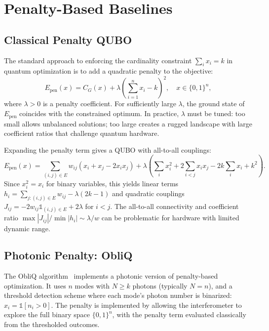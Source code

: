\section{Penalty-Based Baselines}
\label{sec:penalty}

\subsection{Classical Penalty QUBO}

The standard approach to enforcing the cardinality constraint $\sum_i x_i = k$ in quantum optimization is to add a quadratic penalty to the objective:
\begin{equation}
\label{eq:penalty_qubo}
E_{\mathrm{pen}}(x) = C_G(x) + \lambda \left( \sum_{i=1}^n x_i - k \right)^2, \quad x \in \{0,1\}^n,
\end{equation}
where $\lambda > 0$ is a penalty coefficient. For sufficiently large $\lambda$, the ground state of $E_{\mathrm{pen}}$ coincides with the constrained optimum. In practice, $\lambda$ must be tuned: too small allows unbalanced solutions; too large creates a rugged landscape with large coefficient ratios that challenge quantum hardware.

Expanding the penalty term gives a QUBO with all-to-all couplings:
\begin{equation}
E_{\mathrm{pen}}(x) = \sum_{(i,j)\in E} w_{ij} (x_i + x_j - 2x_i x_j) + \lambda \left( \sum_i x_i^2 + 2\sum_{i<j} x_i x_j - 2k\sum_i x_i + k^2 \right).
\end{equation}
Since $x_i^2 = x_i$ for binary variables, this yields linear terms $h_i = \sum_{j:(i,j)\in E} w_{ij} - \lambda(2k-1)$ and quadratic couplings $J_{ij} = -2w_{ij}\mathbb{1}_{(i,j)\in E} + 2\lambda$ for $i<j$. The all-to-all connectivity and coefficient ratio $\max|J_{ij}|/\min|h_i| \sim \lambda/w$ can be problematic for hardware with limited dynamic range.

\subsection{Photonic Penalty: ObliQ}

The ObliQ algorithm~\cite{wang2023bosonic} implements a photonic version of penalty-based optimization. It uses $n$ modes with $N \ge k$ photons (typically $N=n$), and a threshold detection scheme where each mode's photon number is binarized: $x_i = \mathbb{1}[n_i > 0]$. The penalty is implemented by allowing the interferometer to explore the full binary space $\{0,1\}^n$, with the penalty term evaluated classically from the thresholded outcomes.

